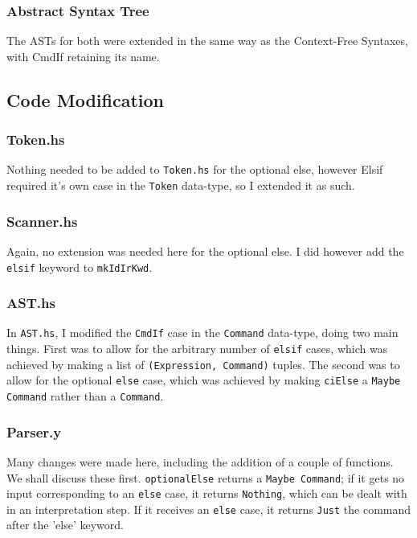 \documentclass[12pt]{article}
\newcommand{\lstin}[3]{
  
}
\begin{document}
\subsubsection{Abstract Syntax Tree}
The ASTs for both were extended in the same way as the Context-Free Syntaxes, with CmdIf retaining its name.

\subsection{Code Modification}
\subsubsection{Token.hs}
Nothing needed to be added to \verb|Token.hs| for the optional else, however Elsif required it's own case in the \verb|Token| data-type, so I extended it as such.

\lstin{49}{49}{Token.hs}

\subsubsection{Scanner.hs}
Again, no extension was needed here for the optional else. 
I did however add the \verb|elsif| keyword to \verb|mkIdIrKwd|.

\lstin{155}{155}{Scanner.hs}

\subsubsection{AST.hs}
In \verb|AST.hs|, I modified the \verb|CmdIf| case in the \verb|Command| data-type, doing two main things. 
First was to allow for the arbitrary number of \verb|elsif| cases, which was achieved by making a list of \verb|(Expression, Command)| tuples. 
The second was to allow for the optional \verb|else| case, which was achieved by making \verb|ciElse| a \verb|Maybe Command| rather than a \verb|Command|.

\lstin{101}{105}{AST.hs}

\subsubsection{Parser.y}
Many changes were made here, including the addition of a couple of functions. 
We shall discuss these first. 
\verb|optionalElse| returns a \verb|Maybe Command|; if it gets no input corresponding to an \verb|else| case, it returns \verb|Nothing|, which can be dealt with in an interpretation step. 
If it receives an \verb|else| case, it returns \verb|Just| the command after the 'else' keyword.
\end{document}
